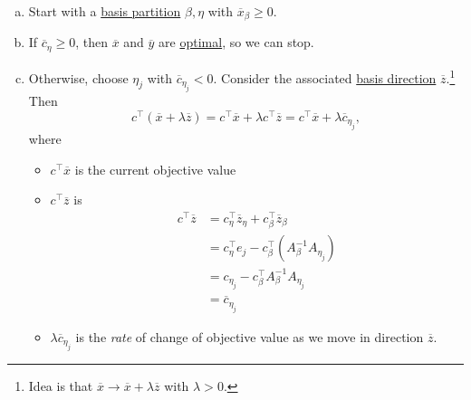 \begin{enumerate}[(a)]
	\item Start with a \hyperref[def:basic-partition]{basis partition} \(\beta, \eta\) with \(\overline{x}_{\beta}\geq 0\).
	\item If \(\overline{c}_{\eta}\geq 0\), then \(\overline{x}\) and \(\overline{y}\) are \hyperref[def:optimal-solution]{optimal}, so we can stop.
	\item Otherwise, choose \(\eta_j\) with \(\overline{c}_{\eta_j}<0\). Consider the associated \hyperref[def:basic-direction]{basis direction} \(\overline{z}\).\footnote{Idea is that \(\overline{x}\to \overline{x}+\lambda \overline{z}\) with \(\lambda >0\).} Then
	      \[
		      c^{\top}(\overline{x} + \lambda \overline{z}) = c^{\top} \overline{x} + \lambda c^{\top} \overline{z} = c^{\top} \overline{x} + \lambda \overline{c}_{\eta_j},
	      \]
	      where \begin{itemize}
		      \item \(c^{\top} \overline{x}\) is the current objective value
		      \item \(c^{\top}\overline{z}\) is
		            \[
			            \begin{split}
				            c^{\top}\overline{z} & = c_{\eta}^{\top} \overline{z}_{\eta}+c_{\beta}^{\top} \overline{z}_{\beta} \\
				                                 & =c_{\eta}^{\top}e_{j} - c_{\beta}^{\top}(A^{-1}_{\beta}A_{\eta_j})          \\
				                                 & =c_{\eta_{j}} - c_{\beta}^{\top} A^{-1}_{\beta}A_{\eta_j}                   \\
				                                 & = \overline{c}_{\eta_{j}}
			            \end{split}
		            \]
		      \item \(\lambda \overline{c}_{\eta_{j}}\) is the \emph{rate} of change of objective value as we move in direction \(\overline{z}\).
	      \end{itemize}


\end{enumerate}
